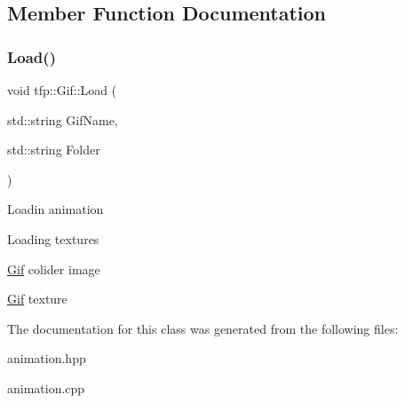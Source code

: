 \subsection{Member Function Documentation}
\mbox{\label{classtfp_1_1_gif_a8311dffa4df0ec1c6f2ed6d88451aae8}} 
\subsubsection{\texorpdfstring{Load()}{Load()}}
{\footnotesize\ttfamily void tfp\+::\+Gif\+::\+Load (\begin{DoxyParamCaption}\item[{std\+::string}]{Gif\+Name,  }\item[{std\+::string}]{Folder }\end{DoxyParamCaption})}

Loadin animation

Loading textures

\mbox{\hyperlink{classtfp_1_1_gif}{Gif}} colider image

\mbox{\hyperlink{classtfp_1_1_gif}{Gif}} texture 

The documentation for this class was generated from the following files\+:\begin{DoxyCompactItemize}
\item 
animation.\+hpp\item 
animation.\+cpp\end{DoxyCompactItemize}
